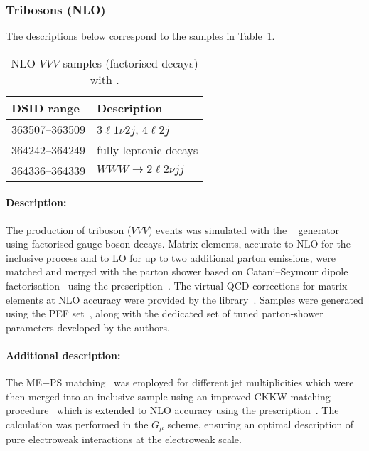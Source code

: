 


\subsubsection{Tribosons (NLO)}

The descriptions below correspond to the samples in
Table~\ref{tab:MB-sherpa-vvvnlo}.

\begin{table}[htbp]
  \caption{NLO $VVV$ samples (factorised decays) with \SHERPA.}%
  \label{tab:MB-sherpa-vvvnlo}
  \centering
  \begin{tabular}{l l}
    \toprule
    DSID range & Description \\
    \midrule
    363507--363509   & $3\ell1\nu2j$, $4\ell2j$\\
    364242--364249   & fully leptonic decays\\
    364336--364339   & $WWW\to 2\ell2\nu jj$\\
    \bottomrule
  \end{tabular}
\end{table}

\paragraph{Description:}

The production of triboson ($VVV$) events was simulated with the 
\SHERPA[2.2.2]~\cite{Bothmann:2019yzt} generator using factorised gauge-boson decays. 
Matrix elements, accurate to NLO for the inclusive process and to LO for up to 
two additional parton emissions, were matched and merged with the \SHERPA parton 
shower based on Catani--Seymour dipole factorisation~\cite{Gleisberg:2008fv,Schumann:2007mg} 
using the \MEPSatNLO prescription~\cite{Hoeche:2011fd,Hoeche:2012yf,Catani:2001cc,Hoeche:2009rj}. 
The virtual QCD corrections for matrix elements at NLO accuracy were 
provided by the \OPENLOOPS library~\cite{Buccioni:2019sur,Cascioli:2011va,Denner:2016kdg}.
Samples were generated using the \NNPDF[3.0nnlo] PEF set~\cite{Ball:2014uwa}, along with
the dedicated set of tuned parton-shower parameters developed by the \SHERPA authors.


\paragraph{Additional description:}

The ME+PS matching~\cite{Hoeche:2011fd} was employed for different jet
multiplicities which were then merged into an inclusive sample 
using an improved CKKW matching procedure~\cite{Catani:2001cc,Hoeche:2009rj} which is extended to NLO
accuracy using the \MEPSatNLO prescription~\cite{Hoeche:2012yf}.  The
calculation was performed in the $G_\mu$ scheme, ensuring an optimal description of pure electroweak interactions at the
electroweak scale.

